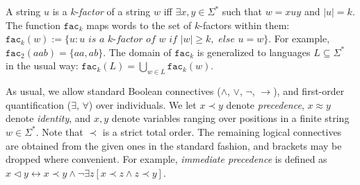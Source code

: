 \documentclass[11pt,a4paper]{article}
\newcommand{\facn}[1]{\ensuremath{\texttt{fac}_{#1}}}
\begin{document}
A string $u$ is a $k$-\emph{factor} of a string $w$ iff $\exists x, y \in \Sigma^*$ such that $w=xuy$ and $|u| = k$. 
The function $\facn{k}$ maps words to the set of $k$-factors within them: $\facn{k}(w) := \{ u : u \textit{ is a $k$-factor of } w \textit{ if } |w| \geq k, \textit{ else } u = w\}$.
For example, $\facn{2}(aab) = \{ aa, ab\}$.
%
The domain of $\facn{k}$ is generalized to languages $L \subseteq \Sigma^*$ in the usual way: $\facn{k}(L) = \bigcup_{w \in L} \facn{k}(w)$.

As usual, we allow standard Boolean connectives ($\wedge$, $\vee$, $\neg$, $\rightarrow $), and first-order quantification ($\exists$, $\forall $) over individuals. 
We let $x \prec y$ denote \emph{precedence}, $x \approx y$ denote \emph{identity}, and $x, y$ denote variables ranging over positions in a finite string $w \in \Sigma^*$. Note that $\prec$ is a strict total order.
The remaining logical connectives are obtained from the given ones in the standard fashion, and brackets may be dropped where convenient. 
For example, \emph{immediate precedence} is defined as $x \triangleleft y \leftrightarrow x \prec y \wedge \neg \exists z [ x \prec z \wedge z \prec y ]$.
%
\end{document}
